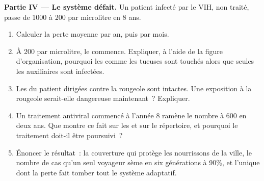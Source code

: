 \begin{problem}
\medskip
\noindent\textbf{Partie IV --- Le système défait.}
Un patient infecté par le VIH, non traité, passe de 1000 à 200
 par microlitre en 8 ans.
\begin{enumerate}[resume]
  \item Calculer la perte moyenne par an, puis par mois.
  \item À 200 par microlitre, le  commence. Expliquer, à l'aide de
        la figure d'organisation, pourquoi les  comme les
         tueuses sont touchés alors que seules les 
        auxiliaires sont infectées.
  \item Les  du patient dirigées contre la rougeole
        sont intactes. Une exposition à la rougeole serait-elle
        dangereuse maintenant~? Expliquer.
  \item Un traitement antiviral commencé à l'année 8 ramène le nombre
        à 600 en deux ans. Que montre ce fait sur les 
        et sur le répertoire, et pourquoi le traitement doit-il être
        poursuivi~?
  \item Énoncer le résultat~: la couverture qui protège les
        nourrissons de la ville, le nombre de cas qu'un seul voyageur
        sème en six générations à 90\%, et l'unique  dont la
        perte fait tomber tout le système adaptatif.
\end{enumerate}
\end{problem}
